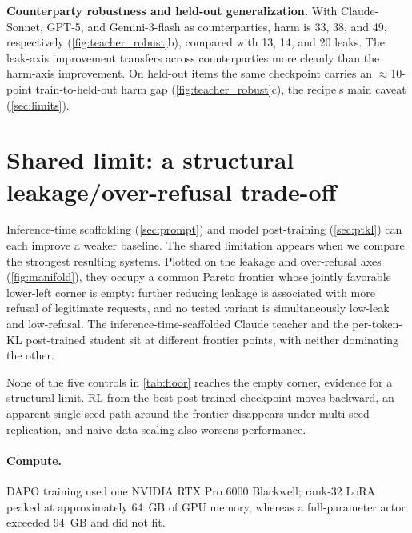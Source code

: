 \documentclass[letterpaper]{article}
\begin{document}
\textbf{Counterparty robustness and held-out generalization.} With Claude-Sonnet, GPT-5, and Gemini-3-flash as counterparties, harm is 33, 38, and 49, respectively (\cref{fig:teacher_robust}b), compared with 13, 14, and 20 leaks. The leak-axis improvement transfers across counterparties more cleanly than the harm-axis improvement. On held-out items the same checkpoint carries an $\approx$10-point train-to-held-out harm gap (\cref{fig:teacher_robust}c), the recipe's main caveat (\cref{sec:limits}).

\section{Shared limit: a structural leakage/over-refusal trade-off}
\label{sec:manifold}
Inference-time scaffolding (\cref{sec:prompt}) and model post-training (\cref{sec:ptkl}) can each improve a weaker baseline. The shared limitation appears when we compare the strongest resulting systems. Plotted on the leakage and over-refusal axes (\cref{fig:manifold}), they occupy a common Pareto frontier whose jointly favorable lower-left corner is empty: further reducing leakage is associated with more refusal of legitimate requests, and no tested variant is simultaneously low-leak and low-refusal. The inference-time-scaffolded Claude teacher and the per-token-KL post-trained student sit at different frontier points, with neither dominating the other.

None of the five controls in \cref{tab:floor} reaches the empty corner, evidence for a structural limit. RL from the best post-trained checkpoint moves backward, an apparent single-seed path around the frontier disappears under multi-seed replication, and naive data scaling also worsens performance.

\paragraph{Compute.} DAPO training used one NVIDIA RTX Pro 6000 Blackwell; rank-32 LoRA peaked at approximately 64~GB of GPU memory, whereas a full-parameter actor exceeded 94~GB and did not fit.
\end{document}
